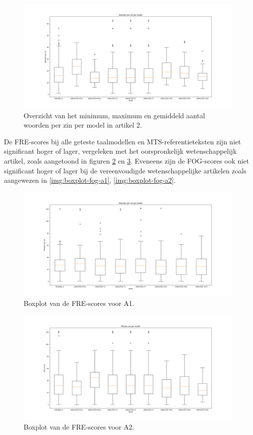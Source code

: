 \begin{figure}
	\includegraphics[width=\linewidth]{img/boxplot-avg-a2.png}
	\caption{Overzicht van het minimum, maximum en gemiddeld aantal woorden per zin per model in artikel 2.}
	\label{img:boxplot-min-max-avg-words-a2}
\end{figure}

\medspace

De FRE-scores bij alle geteste taalmodellen en MTS-referentieteksten zijn niet significant hoger of lager, vergeleken met het oorspronkelijk wetenschappelijk artikel, zoals aangetoond in figuren \ref{img:boxplot-fre-a1} en \ref{img:boxplot-fre-a2}. Eveneens zijn de FOG-scores ook niet significant hoger of lager bij de vereenvoudigde wetenschappelijke artikelen zoals aangewezen in \ref{img:boxplot-fog-a1}, \ref{img:boxplot-fog-a2}.

\begin{figure}
	\includegraphics[width=\linewidth]{img/boxplot-fre-a1.png}
	\caption{Boxplot van de FRE-scores voor A1.}
	\label{img:boxplot-fre-a1}
\end{figure}

\begin{figure}
	\includegraphics[width=\linewidth]{img/boxplot-fre-a2.png}
	\caption{Boxplot van de FRE-scores voor A2.}
	\label{img:boxplot-fre-a2}
\end{figure}

